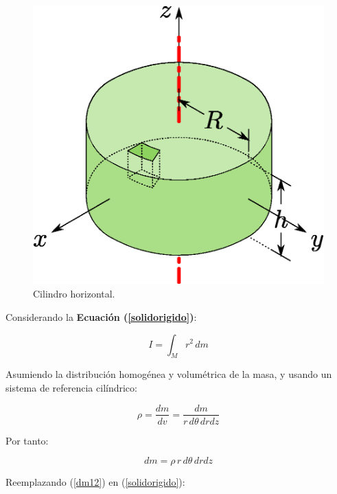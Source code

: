 \documentclass[letter,oneside,11pt]{article}
\begin{document}
\begin{figure}
\centering
\includegraphics[scale=0.5]{resources/f17.eps}
\caption{Cilindro horizontal.}
\label{figura17}
\end{figure}

Considerando la \textbf{Ecuación (\ref{solidorigido})}:

\begin{equation*}
    I = \int_{M} r^2\, dm
\tag{4}
\end{equation*}

Asumiendo la distribución homogénea y volumétrica de la masa, y usando un
sistema de referencia cilíndrico:

\begin{equation*}
    \rho = \frac{dm}{dv} = \frac{dm}{r\, d\theta\, dr dz}
\end{equation*}

Por tanto:

\begin{equation}
    dm = \rho\, r\, d\theta\, dr dz
\label{dm12}
\end{equation}

Reemplazando (\ref{dm12}) en (\ref{solidorigido}):
\end{document}
